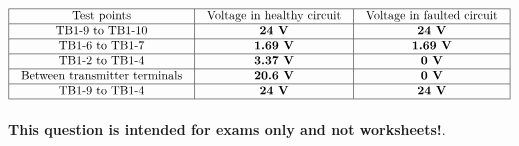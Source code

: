 






$$\vbox{\offinterlineskip
\halign{\strut
\vrule \quad\hfil # \ \hfil & 
\vrule \quad\hfil # \ \hfil & 
\vrule \quad\hfil # \ \hfil \vrule \cr
\noalign{\hrule}
%
Test points & Voltage in healthy circuit & Voltage in faulted circuit \cr
%
\noalign{\hrule}
%
TB1-9 to TB1-10 & {\bf 24 V} & {\bf 24 V} \cr
%
\noalign{\hrule}
%
TB1-6 to TB1-7 & {\bf 1.69 V} & {\bf 1.69 V} \cr
%
\noalign{\hrule}
%
TB1-2 to TB1-4 & {\bf 3.37 V} & {\bf 0 V} \cr
%
\noalign{\hrule}
%
Between transmitter terminals & {\bf 20.6 V} & {\bf 0 V} \cr
%
\noalign{\hrule}
%
TB1-9 to TB1-4 & {\bf 24 V} & {\bf 24 V} \cr
%
\noalign{\hrule}
} %
}$$ %







{\bf This question is intended for exams only and not worksheets!}.



